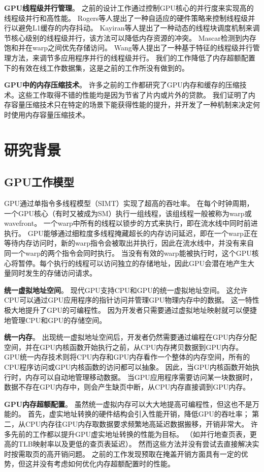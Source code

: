 \textbf{GPU线程级并行管理}。
之前的设计工作通过控制GPU核心的并行度来实现高的线程级并行和高性能。
Rogers等人提出了一种自适应的硬件策略来控制线程级并行以避免L1缓存的内存抖动。
Kayiran等人提出了一种动态的线程块调度机制来调节核心级别的线程级并行，该方法可以降低内存资源的冲突。
Mascar检测到内存饱和并在warp之间优先存储访问。
Wang等人提出了一种基于特征的线程级并行管理方法，来调节多应用程序并行的线程级并行。
我们的工作降低了内存超额配置下的有效在线工作数据集，这是之前的工作所没有做到的。

\textbf{GPU中的内存压缩技术}。
许多之前的工作都研究了GPU内存和缓存的压缩技术。这些工作取得不错的性能均是因为节省了片内或片外的贷款。
我们证明了内存容量压缩技术只在特定的场景下能获得性能的提升，并开发了一种机制来决定何时使用内存容量压缩技术。



\section{研究背景}
\label{background}

\subsection{GPU工作模型}
GPU通过单指令多线程模型（SIMT）实现了超高的吞吐率。
在每个时钟周期，一个GPU核心（有时又被成为SM）执行一组线程，该组线程一般被称为warp或wavefront。
一个warp中所有的线程以锁步的方式来执行，即在流水线中同时前进执行。
GPU能够通过细粒度多线程掩藏超长的内存访问延迟，即在一个warp正在等待内存访问时，新的warp指令会被取出并执行，因此在流水线中，并没有来自同一个warp的两个指令会同时执行。
当没有有效的warp能被执行时，这个GPU核心将暂停。每个执行的线程可以访问独立的存储地址，因此GPU会潜在地产生大量同时发生的存储访问请求。

\textbf{统一虚拟地址空间}。
现代GPU支持CPU和GPU的统一虚拟地址空间。
这允许CPU可以通过GPU应用程序的指针访问并管理GPU物理内存中的数据。
这一特性极大地提升了GPU的可编程性。
因为开发者只需要通过虚拟地址映射就可以便捷地管理CPU和GPU的存储空间。

\textbf{统一内存}。
出现统一虚拟地址空间后，开发者仍然需要通过编程在GPU内存分配空间，并在GPU内核函数开始执行之前，从CPU内存拷贝数据到GPU内存。
GPU统一内存技术则将CPU内存和GPU内存看作一个整体的内存空间，所有的CPU程序访问或GPU内核函数的访问都可以抽象。
因此，当GPU内核函数开始执行时，内存可以自动地管理移动数据。
当GPU应用程序需要访问某一块数据时，数据不存在GPU内存中，则会产生缺页中断，从CPU内存直接调到GPU内存。

\textbf{GPU内存超额配置}。
虽然统一虚拟内存可以大大地提高可编程性，但这也不是万能的。
首先，虚实地址转换的硬件结构会引入性能开销，降低GPU的吞吐率；
第二，从CPU内存往GPU内存取数据要求频繁地高延迟数据搬移，开销非常大。
许多先前的工作都以提升GPU虚实地址转换的性能为目标。
（如并行地查页表，更高的TLB映射率以及更低的查页表延迟）。 
然而这些方法并没有尝试去直接解决实时按需取页的高开销问题。
之前的工作发现预取在掩盖开销方面具有一定的优势，但这并没有考虑如何优化内存超额配置时的性能。

